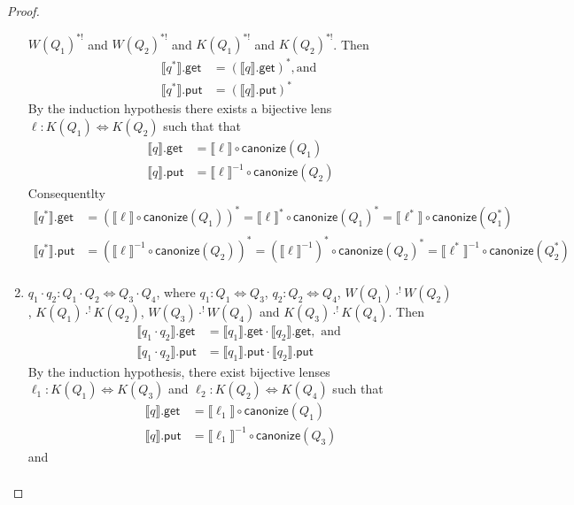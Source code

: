 \documentclass[acmsmall,review,anonymous]{acmart}
\newcommand{\codefont}[1]{\ensuremath{\mathsf{#1}}}
\newcommand{\kw}[1]{\codefont{#1}}
\newcommand{\canonize}{\ensuremath{\kw{canonize}}}
\newcommand{\get}{\ensuremath{\kw{get}}}
\newcommand{\lput}{\ensuremath{\kw{put}}}
\begin{document}
\begin{proof}
\begin{enumerate}
$W(Q_1)^{*!}$ and $W(Q_2)^{*!}$ and $K(Q_1)^{*!}$ and $K(Q_2)^{*!}$. Then
\begin{align*}
\llbracket q^* \rrbracket.\get &= (\llbracket q \rrbracket.\get)^*, \text{
and }\\
\llbracket q^* \rrbracket.\lput &= (\llbracket q \rrbracket.\lput)^*
\end{align*}
By the induction hypothesis there exists a bijective lens $\ell : K(Q_1)
\Leftrightarrow K(Q_2)$ such that
that
\begin{align*}
\llbracket q \rrbracket.\get &= \llbracket \ell \rrbracket \circ
\canonize(Q_1)\\
\llbracket q \rrbracket.\lput &= {\llbracket \ell \rrbracket}^{-1} \circ
\canonize(Q_2)
\end{align*}
Consequentlty
\begin{align*}
\llbracket q^* \rrbracket.\get &= (\llbracket \ell \rrbracket \circ
\canonize(Q_1))^* = \llbracket \ell \rrbracket^* \circ
\canonize(Q_1)^* = \llbracket \ell^* \rrbracket \circ
\canonize(Q_1^*)\\
\llbracket q^* \rrbracket.\lput &= (\llbracket \ell \rrbracket^{-1} \circ
\canonize(Q_2))^* = (\llbracket \ell \rrbracket^{-1})^* \circ
\canonize(Q_2)^* = \llbracket \ell^* \rrbracket^{-1} \circ
\canonize(Q_2^*)\\
\end{align*}
\item
$q_1 \cdot q_2: Q_1 \cdot Q_2 \Leftrightarrow Q_3 \cdot Q_4$, where $q_1 : Q_1
\Leftrightarrow Q_3 $,  $q_2 : Q_2 \Leftrightarrow Q_4$, $W(Q_1)
\cdot^! W(Q_2)$, $K(Q_1) \cdot^! K(Q_2)$, $W(Q_3) \cdot^! W(Q_4)$ and $
K(Q_3) \cdot^! K(Q_4)$. Then
\begin{align*}
\llbracket q_1 \cdot q_2 \rrbracket.\get &= \llbracket q_1 \rrbracket.\get \cdot
\llbracket q_2 \rrbracket.\get, \text{ and }\\
\llbracket q_1 \cdot q_2 \rrbracket.\lput &= \llbracket q_1 \rrbracket.\lput
\cdot \llbracket q_2 \rrbracket.\lput
\end{align*}
By the induction hypothesis, there exist bijective lenses $\ell_1 : K(Q_1)
\Leftrightarrow K(Q_3)$ and $\ell_2 : K(Q_2) \Leftrightarrow K(Q_4)$ such that
\begin{align*}
\llbracket q \rrbracket.\get &= \llbracket \ell_1 \rrbracket \circ
\canonize(Q_1)\\
\llbracket q \rrbracket.\lput &= {\llbracket \ell_1 \rrbracket}^{-1} \circ
\canonize(Q_3)
\end{align*}
and
\begin{align*}

\end{align*}
\end{enumerate}
\end{proof}
\end{document}

